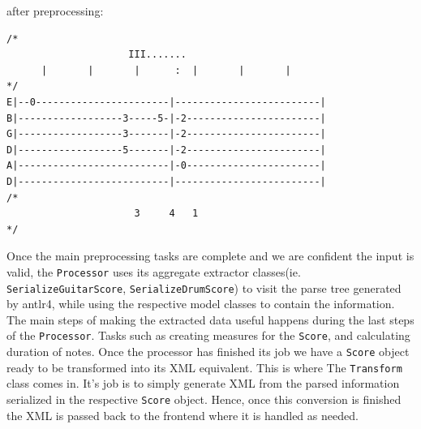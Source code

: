 \documentclass[11pt]{article}
\begin{document}
after preprocessing:
\begin{verbatim}
/*
	                 III.......
	  |       |       |      :  |       |       |
*/
E|--0-----------------------|-------------------------|
B|------------------3-----5-|-2-----------------------|
G|------------------3-------|-2-----------------------|
D|------------------5-------|-2-----------------------|
A|--------------------------|-0-----------------------|
D|--------------------------|-------------------------|
/*
	                  3     4   1
*/
\end{verbatim}

Once the main preprocessing tasks are complete and we are confident the input is valid, the \texttt{Processor} uses its aggregate extractor classes(ie. \texttt{SerializeGuitarScore}, \texttt{SerializeDrumScore}) to visit the parse tree generated by antlr4, while using the respective model classes to contain the information. The main steps of making the extracted data useful happens during the last steps of the \texttt{Processor}. Tasks such as creating measures for the \texttt{Score}, and calculating duration of notes. Once the processor has finished its job we have a \texttt{Score} object ready to be transformed into its XML equivalent. This is where The \texttt{Transform} class comes in. It's job is to simply generate XML from the parsed information serialized in the respective \texttt{Score} object. Hence, once this conversion is finished the XML is passed back to the frontend where it is handled as needed.
\end{document}
